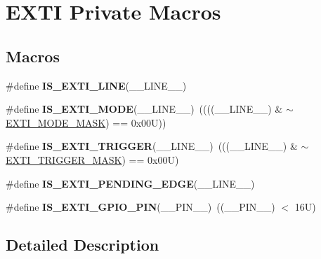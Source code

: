 \hypertarget{group___e_x_t_i___private___macros}{}\section{E\+X\+TI Private Macros}
\label{group___e_x_t_i___private___macros}
\subsection*{Macros}
\begin{DoxyCompactItemize}
\item 
\#define {\bfseries I\+S\+\_\+\+E\+X\+T\+I\+\_\+\+L\+I\+NE}(\+\_\+\+\_\+\+L\+I\+N\+E\+\_\+\+\_\+)
\item 
\mbox{\label{group___e_x_t_i___private___macros_gaa8a0977af667f831424dcd75ecb6709b}} 
\#define {\bfseries I\+S\+\_\+\+E\+X\+T\+I\+\_\+\+M\+O\+DE}(\+\_\+\+\_\+\+L\+I\+N\+E\+\_\+\+\_\+)~((((\+\_\+\+\_\+\+L\+I\+N\+E\+\_\+\+\_\+) \& $\sim$\hyperlink{group___e_x_t_i___private___constants_ga657f081646b552ee10bdfc7af94b5cdf}{E\+X\+T\+I\+\_\+\+M\+O\+D\+E\+\_\+\+M\+A\+SK}) == 0x00\+U))
\item 
\mbox{\label{group___e_x_t_i___private___macros_ga0a4ff8a2705f40043db7c3e5d7cf0059}} 
\#define {\bfseries I\+S\+\_\+\+E\+X\+T\+I\+\_\+\+T\+R\+I\+G\+G\+ER}(\+\_\+\+\_\+\+L\+I\+N\+E\+\_\+\+\_\+)~(((\+\_\+\+\_\+\+L\+I\+N\+E\+\_\+\+\_\+) \& $\sim$\hyperlink{group___e_x_t_i___private___constants_ga3e14df666414849fd5a3907a96a2a892}{E\+X\+T\+I\+\_\+\+T\+R\+I\+G\+G\+E\+R\+\_\+\+M\+A\+SK}) == 0x00\+U)
\item 
\#define {\bfseries I\+S\+\_\+\+E\+X\+T\+I\+\_\+\+P\+E\+N\+D\+I\+N\+G\+\_\+\+E\+D\+GE}(\+\_\+\+\_\+\+L\+I\+N\+E\+\_\+\+\_\+)
\item 
\mbox{\label{group___e_x_t_i___private___macros_ga82f191b2ea96948f302dc6c2108ea534}} 
\#define {\bfseries I\+S\+\_\+\+E\+X\+T\+I\+\_\+\+G\+P\+I\+O\+\_\+\+P\+IN}(\+\_\+\+\_\+\+P\+I\+N\+\_\+\+\_\+)~((\+\_\+\+\_\+\+P\+I\+N\+\_\+\+\_\+) $<$ 16\+U)
\end{DoxyCompactItemize}


\subsection{Detailed Description}


